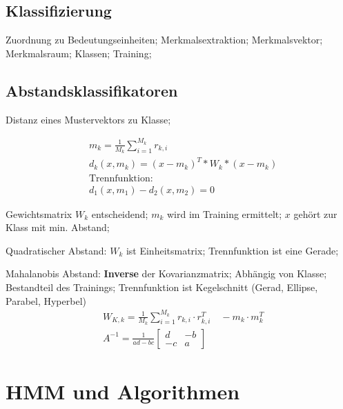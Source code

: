 \documentclass[german,color,6pt]{latex4ei/latex4ei_sheet}
\begin{document}
\begin{sectionbox}
\subsection{Klassifizierung}
Zuordnung zu Bedeutungseinheiten; Merkmalsextraktion; Merkmalsvektor; Merkmalsraum; Klassen; Training; 
\end{sectionbox}

\begin{sectionbox}
\subsection{Abstandsklassifikatoren}
Distanz eines Mustervektors zu Klasse; 

\begin{equation*}
\begin{split}
 & m_k = \frac{1}{M_k} \sum\limits^{M_k}_{i=1} r_{k,i} \\
 & d_k (x, m_k) = (x - m_k)^T * W_k * (x-m_k) \\
 & \text{Trennfunktion: } \\
 & d_1 (x, m_1) - d_2 (x, m_2) = 0
\end{split}
\end{equation*}

Gewichtsmatrix $W_k$ entscheidend; $m_k$ wird im Training ermittelt; $x$ gehört zur Klass mit min. Abstand; 

Quadratischer Abstand: $W_k$ ist Einheitsmatrix; Trennfunktion ist eine Gerade;

Mahalanobis Abstand: \textbf{Inverse} der Kovarianzmatrix; Abhängig von Klasse; Bestandteil des Trainings; Trennfunktion ist Kegelschnitt (Gerad, Ellipse, Parabel, Hyperbel)
\begin{equation*}
\begin{split}
	& W_{K,k} = \frac{1}{M_k} \sum\limits^{M_k}_{i=1} r_{k,i} \cdot r^T_{k,i} \quad -m_k \cdot m_k^T \\
	& A^{-1} = \frac{1}{ad-bc}\begin{bmatrix} d & -b \\ -c & a \end{bmatrix}
\end{split}
\end{equation*}
\end{sectionbox}

\columnbreak


\section{HMM und Algorithmen}
\end{document}
